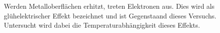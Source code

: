 Werden Metalloberflächen erhitzt, treten Elektronen aus. Dies wird als glühelektrischer Effekt bezeichnet
und ist Gegenstaand dieses Versuchs. Untersucht wird dabei die Temperaturabhängigkeit dieses Effekts.
